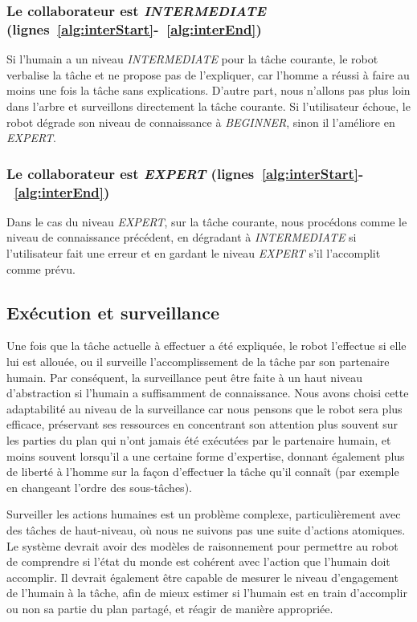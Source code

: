 \documentclass[a4paper,11pt,twoside]{StyleThese}
\begin{document}
\subsubsection{Le collaborateur est \textit{INTERMEDIATE} (lignes~\ref{alg:interStart}-~\ref{alg:interEnd})} Si l'humain a un niveau  \textit{INTERMEDIATE} pour la tâche courante, le robot verbalise la tâche et ne propose pas de l'expliquer, car l'homme a réussi à faire au moins une fois la tâche sans explications. D'autre part, nous n'allons pas plus loin dans l'arbre et surveillons directement la tâche courante. Si l'utilisateur échoue, le robot dégrade son niveau de connaissance à \textit{BEGINNER}, sinon il l'améliore en \textit{EXPERT}.

\subsubsection{Le collaborateur est \textit{EXPERT} (lignes~\ref{alg:interStart}-~\ref{alg:interEnd})} Dans le cas du niveau \textit{EXPERT}, sur la tâche courante, nous procédons comme le niveau de connaissance précédent, en dégradant à \textit{INTERMEDIATE} si l'utilisateur fait une erreur et en gardant le niveau \textit{EXPERT} s'il l'accomplit comme prévu.

\subsection{Exécution et surveillance}
Une fois que la tâche actuelle à effectuer a été expliquée, le robot l'effectue si elle lui est allouée, ou il surveille l'accomplissement de la tâche par son partenaire humain. Par conséquent, la surveillance peut être faite à un haut niveau d'abstraction si l'humain a suffisamment de connaissance.
Nous avons choisi cette adaptabilité au niveau de la surveillance car nous pensons que le robot sera plus efficace, préservant ses ressources en concentrant son attention plus souvent sur les parties du plan qui n'ont jamais été exécutées par le partenaire humain, et moins souvent lorsqu'il a une certaine forme d'expertise, donnant également plus de liberté à l'homme sur la façon d'effectuer la tâche qu'il connaît (par exemple en changeant l'ordre des sous-tâches).

Surveiller les actions humaines est un problème complexe, particulièrement avec des tâches de haut-niveau, où nous ne suivons pas une suite d'actions atomiques. Le système devrait avoir des modèles de raisonnement pour permettre au robot de comprendre si l'état du monde est cohérent avec l'action que l'humain doit accomplir. Il devrait également être capable de mesurer le niveau d'engagement de l'humain à la tâche, afin de mieux estimer si l'humain est en train d'accomplir ou non sa partie du plan partagé, et réagir de manière appropriée.
\end{document}
